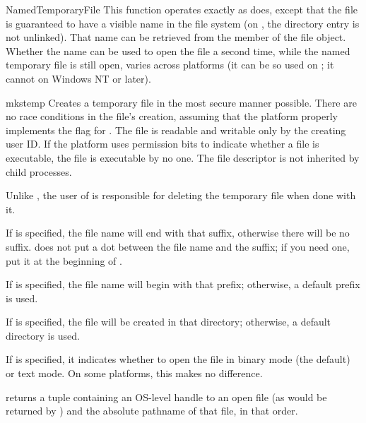 \begin{funcdesc}{NamedTemporaryFile}{}
This function operates exactly as  does,
except that the file is guaranteed to have a visible name in the file
system (on \UNIX, the directory entry is not unlinked).  That name can
be retrieved from the  member of the file object.  Whether
the name can be used to open the file a second time, while the
named temporary file is still open, varies across platforms (it can
be so used on \UNIX; it cannot on Windows NT or later).
\end{funcdesc}

\begin{funcdesc}{mkstemp}{}
Creates a temporary file in the most secure manner possible.  There
are no race conditions in the file's creation, assuming that the
platform properly implements the  flag for
.  The file is readable and writable only by the
creating user ID.  If the platform uses permission bits to indicate
whether a file is executable, the file is executable by no one.  The
file descriptor is not inherited by child processes.

Unlike , the user of  is
responsible for deleting the temporary file when done with it.

If  is specified, the file name will end with that suffix,
otherwise there will be no suffix.   does not put a
dot between the file name and the suffix; if you need one, put it at
the beginning of .

If  is specified, the file name will begin with that
prefix; otherwise, a default prefix is used.

If  is specified, the file will be created in that directory;
otherwise, a default directory is used.

If  is specified, it indicates whether to open the file in
binary mode (the default) or text mode.  On some platforms, this makes
no difference.

 returns a tuple containing an OS-level handle to
an open file (as would be returned by ) and the
absolute pathname of that file, in that order.
\end{funcdesc}


